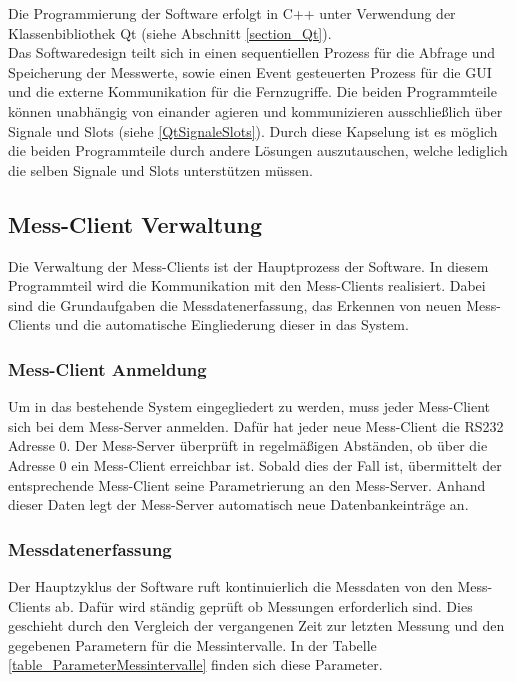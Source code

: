 Die Programmierung der Software erfolgt in C++ unter Verwendung der Klassenbibliothek Qt (siehe Abschnitt \ref{section_Qt}).\\
Das Softwaredesign teilt sich in einen sequentiellen Prozess für die Abfrage und Speicherung der Messwerte, sowie einen Event gesteuerten Prozess für die \ac{GUI} und die externe Kommunikation für die Fernzugriffe. 
Die beiden Programmteile können unabhängig von einander agieren und kommunizieren ausschließlich über Signale und Slots (siehe \ref{QtSignaleSlots}). Durch diese Kapselung ist es möglich die beiden Programmteile durch andere Lösungen auszutauschen, welche lediglich die selben Signale und Slots unterstützen müssen.\ 



\subsection{Mess-Client Verwaltung}
Die Verwaltung der Mess-Clients ist der Hauptprozess der Software. In diesem Programmteil wird die Kommunikation mit den Mess-Clients realisiert. Dabei sind die Grundaufgaben die Messdatenerfassung, das Erkennen von neuen Mess-Clients und die automatische Eingliederung dieser in das System.

\subsubsection{Mess-Client Anmeldung}
Um in das bestehende System eingegliedert zu werden, muss jeder Mess-Client sich bei dem Mess-Server anmelden. Dafür hat jeder neue Mess-Client die RS232 Adresse 0. Der Mess-Server überprüft in regelmäßigen Abständen, ob über die Adresse 0 ein Mess-Client erreichbar ist. Sobald dies der Fall ist, übermittelt der entsprechende Mess-Client seine Parametrierung an den Mess-Server. Anhand dieser Daten legt der Mess-Server automatisch neue Datenbankeinträge an.

\subsubsection{Messdatenerfassung}

Der Hauptzyklus der Software ruft kontinuierlich die Messdaten von den Mess-Clients ab. Dafür wird ständig geprüft ob Messungen erforderlich sind. Dies geschieht durch den Vergleich der vergangenen Zeit zur letzten Messung und den gegebenen Parametern für die Messintervalle. In der Tabelle \ref{table_ParameterMessintervalle} finden sich diese Parameter.\\


